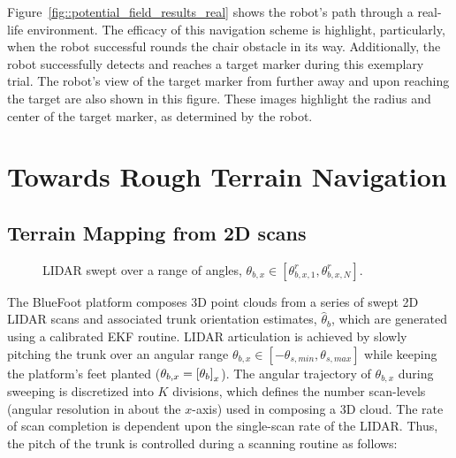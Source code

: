 			Figure~\ref{fig::potential_field_results_real} shows the robot's path through a real-life environment. The efficacy of this navigation scheme is highlight, particularly, when the robot successful rounds the chair obstacle in its way. Additionally, the robot successfully detects and reaches a target marker during this exemplary trial. The robot's view of the target marker from further away and upon reaching the target are also shown in this figure. These images highlight the radius and center of the target marker, as determined by the robot.


	\section{Towards Rough Terrain Navigation}


		\subsection{Terrain Mapping from 2D scans}
			\label{ssec::terrain_mapping}
			\begin{figure}[!h]
				\centering
				\caption{LIDAR swept over a range of angles, $\theta_{b,x} \in [\theta_{b,x,1}^{r},\theta_{b,x,N}^{r}]$. }
				\label{fig::sensor_sweep}
			\end{figure}
			The BlueFoot platform composes 3D point clouds from a series of swept 2D LIDAR scans and associated trunk orientation estimates, $\hat{\theta}_{b}$, which are generated using a calibrated EKF routine. LIDAR articulation is achieved by slowly pitching the trunk over an angular range $\theta_{b,x}\in[-\theta_{s,min},\theta_{s,max}]$ while keeping the platform's feet planted ($\theta_{b,x}=\left[\theta_{b}\right]_{x}$). The angular trajectory of $\theta_{b,x}$ during sweeping is discretized into $K$ divisions, which defines the number scan-levels (angular resolution in about the $x$-axis) used in composing a 3D cloud. The rate of scan completion is dependent upon the single-scan rate of the LIDAR. Thus, the pitch of the trunk is controlled during a scanning routine as follows:
